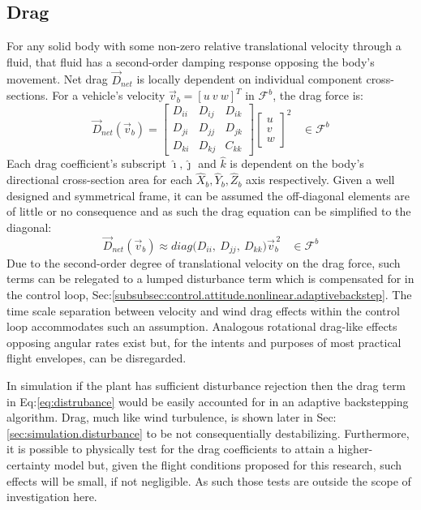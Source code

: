 \subsection{Drag}
\label{subsec:dynamics.aero.drag}
For any solid body with some non-zero relative translational velocity through a fluid, that fluid has a second-order damping response opposing the body's movement. Net drag $\vec{D}_{net}$ is locally dependent on individual component cross-sections. For a vehicle's velocity $\vec{v}_b=[u~v~w]^T$ in $\mathcal{F}^b$, the drag force is:
\begin{equation}\label{eq:distrubance}
\vec{D}_{net}(\vec{v}_b)=\begin{bmatrix}
D_{ii} & D_{ij} & D_{ik}\\
D_{ji} & D_{jj} & D_{jk}\\
D_{ki} & D_{kj} & C_{kk}
\end{bmatrix}
\begin{bmatrix}
u\\
v\\
w
\end{bmatrix}^2
~~~~\in\mathcal{F}^b
\end{equation}
Each drag coefficient's subscript $\hat{\imath},\hat{\jmath}$ and $\hat{k}$ is dependent on the body's directional cross-section area for each $\hat{X}_b,\hat{Y}_b,\hat{Z}_b$ axis respectively. Given a well designed and symmetrical frame, it can be assumed the off-diagonal elements are of little or no consequence and as such the drag equation can be simplified to the diagonal:
\begin{equation}
\vec{D}_{net}(\vec{v}_b)\approx diag\big(D_{ii},~D_{jj},~D_{kk}\big)\vec{v}_b^{\hspace{2pt}2}~~~~\in\mathcal{F}^b
\end{equation}
Due to the second-order degree of translational velocity on the drag force, such terms can be relegated to a lumped disturbance term which is compensated for in the control loop, Sec:\ref{subsubsec:control.attitude.nonlinear.adaptivebackstep}. The time scale separation between velocity and wind drag effects within the control loop accommodates such an assumption. Analogous rotational drag-like effects opposing angular rates exist but, for the intents and purposes of most practical flight envelopes, can be disregarded. 
\par
In simulation if the plant has sufficient disturbance rejection then the drag term in Eq:\ref{eq:distrubance} would be easily accounted for in an adaptive backstepping algorithm. Drag, much like wind turbulence, is shown later in Sec:\ref{sec:simulation.disturbance} to be not consequentially destabilizing. Furthermore, it is possible to physically test for the drag coefficients to attain a higher-certainty model but, given the flight conditions proposed for this research, such effects will be small, if not negligible. As such those tests are outside the scope of investigation here.

